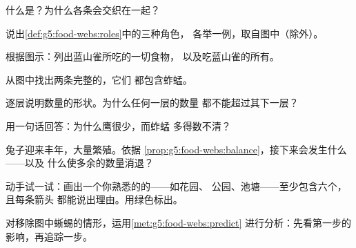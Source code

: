\begin{exercise}[$\star$]\label{exo:g5:food-webs:1}
什么是？为什么各条会交织在一起？
\end{exercise}

\begin{exercise}[$\star$]\label{exo:g5:food-webs:2}
说出\cref{def:g5:food-webs:roles}中的三种角色，
各举一例，取自图中（除外）。
\end{exercise}

\begin{exercise}[$\star$]\label{exo:g5:food-webs:3}
根据图示：列出蓝山雀所吃的一切食物，
以及吃蓝山雀的所有。
\end{exercise}

\begin{exercise}[$\star$]\label{exo:g5:food-webs:4}
从图中找出两条完整的，它们
都包含蚱蜢。
\end{exercise}

\begin{exercise}[$\star$]\label{exo:g5:food-webs:5}
逐层说明数量的形状。为什么任何一层的数量
都不能超过其下一层？
\end{exercise}

\begin{exercise}[$\star$]\label{exo:g5:food-webs:6}
用一句话回答：为什么鹰很少，而蚱蜢
多得数不清？
\end{exercise}

\begin{exercise}[$\star$]\label{exo:g5:food-webs:7}
兔子迎来丰年，大量繁殖。依据
\cref{prop:g5:food-webs:balance}，接下来会发生什么——以及
什么使多余的数量消退？
\end{exercise}

\begin{exercise}[$\star$]\label{exo:g5:food-webs:8}
动手试一试：画出一个你熟悉的的——如花园、
公园、池塘——至少包含六个，且每条箭头
都能说出理由。用绿色标出。
\end{exercise}

\begin{exercise}[$\star\star$]\label{exo:g5:food-webs:9}
对移除图中蜥蜴的情形，运用\cref{met:g5:food-webs:predict}
进行分析：先看第一步的影响，再追踪一步。
\end{exercise}

